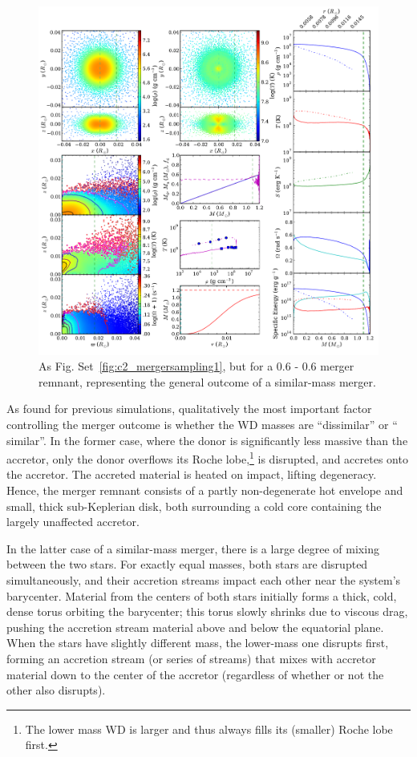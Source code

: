 \begin{figure}
\centering
\includegraphics[width=1.0\columnwidth]{chapter2_zhu+13/figures/pt6pt6.pdf}
\caption{As Fig. Set~\ref{fig:c2_mergersampling1}, but for a 0.6 - 0.6 {\Msun} merger remnant, representing the general outcome of a similar-mass merger.}
\label{fig:c2_mergersampling2}
\end{figure}

As found for previous simulations, qualitatively the most important factor controlling the merger outcome is whether the WD masses are ``dissimilar'' or `` similar''.  In the former case, where the donor is significantly less massive than the accretor, only the donor overflows its Roche lobe,\footnote{The lower mass WD is larger and thus always fills its (smaller) Roche lobe first.} is disrupted, and accretes onto the accretor.  The accreted material is heated on impact, lifting degeneracy.  Hence, the merger remnant consists of a partly non-degenerate hot envelope and small, thick sub-Keplerian disk, both surrounding a cold core containing the largely unaffected accretor.

In the latter case of a similar-mass merger, there is a large degree of mixing between the two stars.  For exactly equal masses, both stars are disrupted simultaneously, and their accretion streams impact each other near the system's barycenter.  Material from the centers of both stars initially forms a thick, cold, dense torus orbiting the barycenter; this torus slowly shrinks due to viscous drag, pushing the accretion stream material above and below the equatorial plane.  When the stars have slightly different mass, the lower-mass one disrupts first, forming an accretion stream (or series of streams) that mixes with accretor material down to the center of the accretor (regardless of whether or not the other also disrupts).

